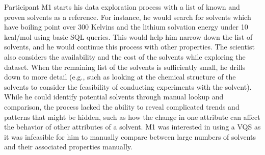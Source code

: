  Participant M1 starts his data exploration process with a list of known and proven solvents as a reference. For instance, he would search for solvents which have boiling point over 300 Kelvins and the lithium solvation energy under 10 kcal/mol using basic SQL queries. This would help him narrow down the list of solvents, and he would continue this process with other properties. The scientist also considers the availability and the cost of the solvents while exploring the dataset. When the remaining list of the solvents is sufficiently small, he drills down to more detail (e.g., such as looking at the chemical structure of the solvents to consider the feasibility of conducting experiments with the solvent). While he could identify potential solvents through  manual lookup and comparison,  the process lacked the ability to reveal complicated trends and patterns that might be hidden, such as how the change in one attribute can affect the behavior of other attributes of a solvent. M1 was interested in using a VQS as it was infeasible for him to manually compare between large numbers of solvents and their associated properties manually.
\raggedbottom